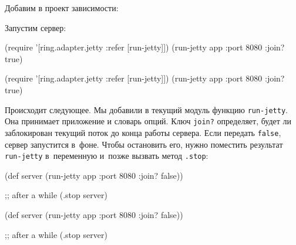 
Добавим в проект зависимости:

\begin{english}
  \begin{clojure}
  \end{clojure}
\end{english}

Запустим сервер:

\ifx\DEVICETYPE\MOBILE

\begin{english}
  \begin{clojure}
(require '[ring.adapter.jetty
           :refer [run-jetty]])
(run-jetty app {:port 8080 :join? true})
  \end{clojure}
\end{english}

\else

\begin{english}
  \begin{clojure}
(require '[ring.adapter.jetty :refer [run-jetty]])
(run-jetty app {:port 8080 :join? true})
  \end{clojure}
\end{english}

\fi

Происходит следующее. Мы добавили в текущий модуль функцию
\verb|run-jetty|. Она принимает приложение и словарь опций. Ключ
\verb|join?| определяет, будет ли заблокирован текущий поток до конца работы
сервера. Если передать \verb|false|, сервер запустится в~фоне. Чтобы
остановить его, нужно поместить результат \verb|run-jetty| в~переменную
и~позже вызвать метод \verb|.stop|:

\ifx\DEVICETYPE\MOBILE

\begin{english}
  \begin{clojure}
(def server
  (run-jetty app {:port 8080
                  :join? false}))

;; after a while
(.stop server)
  \end{clojure}
\end{english}

\else

\begin{english}
  \begin{clojure}
(def server
  (run-jetty app {:port 8080 :join? false}))

;; after a while
(.stop server)
  \end{clojure}
\end{english}

